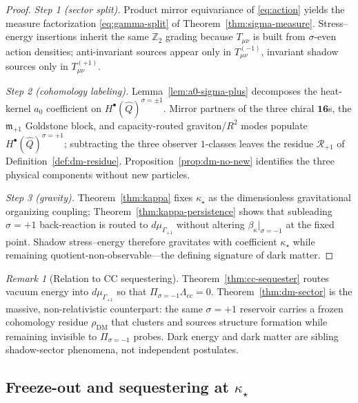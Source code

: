 \documentclass[11pt]{article}
\theoremstyle{plain}
\theoremstyle{definition}
\theoremstyle{remark}
\newtheorem{remark}[theorem]{Remark}
\numberwithin{equation}{section}
\begin{document}
\begin{proof}
\emph{Step 1 (sector split).}
Product mirror equivariance of \eqref{eq:action} yields the measure
factorization \eqref{eq:gamma-split} of Theorem~\ref{thm:sigma-measure}.
Stress--energy insertions inherit the same $\mathbb{Z}_2$ grading because
$T_{\mu\nu}$ is built from $\sigma$-even action densities; anti-invariant
sources appear only in $T_{\mu\nu}^{(-1)}$, invariant shadow sources only in
$T_{\mu\nu}^{(+1)}$.

\emph{Step 2 (cohomology labeling).}
Lemma~\ref{lem:a0-sigma-plus} decomposes the heat-kernel $a_0$ coefficient on
$H^\bullet(\hat Q)^{\sigma=\pm1}$. Mirror partners of the three chiral
$\mathbf{16}$s, the $\mathfrak{m}_{+1}$ Goldstone block, and
capacity-routed graviton/$R^2$ modes populate $H^\bullet(\hat Q)^{\sigma=+1}$;
subtracting the three observer $1$-classes leaves the residue
$\mathcal{R}_{+1}$ of Definition~\ref{def:dm-residue}. Proposition~\ref{prop:dm-no-new}
identifies the three physical components without new particles.

\emph{Step 3 (gravity).}
Theorem~\ref{thm:kappa} fixes $\kappa_\star$ as the dimensionless gravitational
organizing coupling; Theorem~\ref{thm:kappa-persistence} shows that
subleading $\sigma=+1$ back-reaction is routed to $d\mu_{\Gamma_{+1}}$ without
altering $\beta_\kappa|_{\sigma=-1}$ at the fixed point. Shadow stress--energy
therefore gravitates with coefficient $\kappa_\star$ while remaining
quotient-non-observable---the defining signature of dark matter.
\end{proof}

\begin{remark}[Relation to CC sequestering]
Theorem~\ref{thm:cc-sequester} routes vacuum energy into
$d\mu_{\Gamma_{+1}}$ so that $\Pi_{\sigma=-1}\Lambda_{\mathrm{cc}}=0$.
Theorem~\ref{thm:dm-sector} is the massive, non-relativistic counterpart:
the same $\sigma=+1$ reservoir carries a frozen cohomology residue
$\rho_{\mathrm{DM}}$ that clusters and sources structure formation while
remaining invisible to $\Pi_{\sigma=-1}$ probes. Dark energy and dark matter
are sibling shadow-sector phenomena, not independent postulates.
\end{remark}

\subsection{Freeze-out and sequestering at $\kappa_\star$}
\label{sec:dark-sector:abundance}
\end{document}
